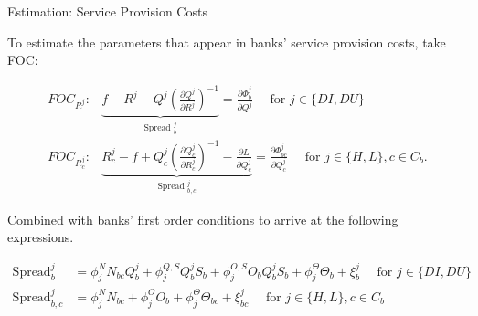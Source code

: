 \documentclass[notes,10pt, aspectratio=169]{beamer}
\newenvironment{wideitemize}{\itemize\addtolength{\itemsep}{10pt}}{\enditemize}
\begin{document}
\begin{frame}{Estimation: Service Provision Costs}

        \vspace{0.3cm}
        \begin{wideitemize}

            \item To estimate the parameters that appear in banks' service provision costs, take FOC:
            
            $$
            \begin{aligned}
 F O C_{R^j}: & \underbrace{f-R^j-Q^j\left(\frac{\partial Q^j}{\partial R^j}\right)^{-1}}_{\text {Spread }_b^j}=\frac{\partial \Phi_b^j}{\partial Q^j} \quad \text { for } j \in\{D I, D U\} \\
 F O C_{R_c^j}: & \underbrace{R_c^j-f+Q_c^j\left(\frac{\partial Q_c^j}{\partial R_c^j}\right)^{-1}-\frac{\partial L}{\partial Q_c^j}}_{\text {Spread }_{b, c}^j}=\frac{\partial \Phi_{b c}^j}{\partial Q_c^j} \quad \text { for } j \in\{H, L\}, c \in C_b .
            \end{aligned}
            $$
            
            
            \item Combined with banks' first order conditions to arrive at the following expressions.
            
            $$
            \begin{aligned}
            \operatorname{Spread}_b^j & =\phi_j^N N_{b c} Q_b^j+\phi_j^{Q, S} Q_b^j S_b+\phi_j^{O, S} O_b Q_b^j S_b+\phi_j^{\Theta} \Theta_b+\xi_b^j \quad \text { for } j \in\{D I, D U\} \\
            \operatorname{Spread}_{b, c}^j & =\phi_j^N N_{b c}+\phi_j^O O_b+\phi_j^{\Theta} \Theta_{b c}+\xi_{b c}^j \quad \text { for } j \in\{H, L\}, c \in C_b
            \end{aligned}
            $$
            
    \end{wideitemize}

\end{frame}
\end{document}
